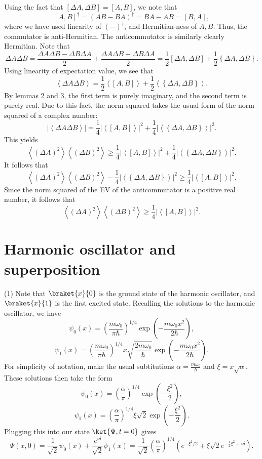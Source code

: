 \documentclass[11pt, letterpaper]{article}
\begin{document}
Using the fact that $[\Delta A,\Delta B]=[A,B]$, we note that
\[
	\left[ A,B \right] ^\dagger = \left( AB-BA \right) ^\dagger=BA-AB=[B,A],
\]
where we have used linearity of $(-)^\dagger$, and Hermitian-ness of $A,B$. Thus, the commutator is anti-Hermitian. The anticommutator is similarly clearly Hermitian. Note that
\[
	\Delta A\Delta B=\frac{\Delta A\Delta B-\Delta B\Delta A}{2} +\frac{\Delta A\Delta B+\Delta B\Delta A}{2} =\frac{1}{2} [\Delta A,\Delta B]+\frac{1}{2} \left\{ \Delta A,\Delta B \right\} 
.\]
Using linearity of expectation value, we see that
\[
	\left\langle \Delta A\Delta B \right\rangle =\frac{1}{2} \left\langle [A,B] \right\rangle +\frac{1}{2} \left\langle \left\{ \Delta A,\Delta B \right\}  \right\rangle 
.\]
By lemmas 2 and 3, the first term is purely imaginary, and the second term is purely real. Due to this fact, the norm squared takes the usual form of the norm squared of a complex number:
\[
	\left| \left\langle \Delta A\Delta B \right\rangle  \right| =\frac{1}{4} \left| \left\langle \left[ A,B \right]  \right\rangle  \right| ^2+\frac{1}{4} \left| \left\langle \left\{ \Delta A,\Delta B \right\}  \right\rangle  \right| ^2
.\]
This yields
\[
	\left\langle (\Delta A)^2 \right\rangle \left\langle (\Delta B)^2 \right\rangle\geq \frac{1}{4} \left| \left\langle \left[ A,B \right]  \right\rangle  \right| ^2+\frac{1}{4} \left| \left\langle \left\{ \Delta A,\Delta B \right\}  \right\rangle  \right| ^2
.\]
It follows that
\[
	\left\langle (\Delta A)^2 \right\rangle \left\langle (\Delta B)^2 \right\rangle-\frac{1}{4} \left| \left\langle \left\{ \Delta A,\Delta B \right\}  \right\rangle  \right| ^2\geq \frac{1}{4} \left| \left\langle \left[ A,B \right]  \right\rangle  \right| ^2
.\]
Since the norm squared of the EV of the anticommutator is a positive real number, it follows that
\[
	\left\langle (\Delta A)^2 \right\rangle \left\langle (\Delta B)^2 \right\rangle\geq \frac{1}{4} \left| \left\langle \left[ A,B \right]  \right\rangle  \right| ^2
.\]
\section{Harmonic oscillator and superposition}
(1) Note that $\braket{x}{0}$ is the ground state of the harmonic oscillator, and $\braket{x}{1}$ is the first excited state. Recalling the solutions to the harmonic oscillator, we have
\[
	\psi _0(x)=\left( \frac{m\omega _0}{\pi \hbar}  \right) ^{1/4} \exp \left( -\frac{m\omega _0x^2}{2\hbar}  \right) 
,\]
\[
	\psi _1(x)=\left( \frac{m\omega _0}{\pi \hbar}  \right) ^{1/4} x\sqrt{\frac{2m\omega _0}{\hbar} } \exp \left( -\frac{m\omega _0x^2}{2\hbar}  \right) 
.\]
For simplicity of notation, make the usual subtitutions $\alpha=\frac{m\omega _0}{\hbar} $ and $\xi =x\sqrt{\alpha } $. These solutions then take the form
\[
	\psi _0(x)=\left( \frac{\alpha }{\pi }  \right) ^{1/4} \exp \left( -\frac{\xi ^2}{2}   \right) ,
\]
\[
	\psi _1(x)=\left( \frac{\alpha }{\pi }  \right) ^{1/4} \xi \sqrt{2}\exp \left( -\frac{\xi ^2}{2}  \right) 
.\]
Plugging this into our state $\ket{\Psi ,t=0}$ gives
\[
	\Psi (x,0)=\frac{1}{\sqrt{2} } \psi _0(x)+\frac{e^{i\delta } }{\sqrt{2} } \psi _1(x)=\frac{1}{\sqrt{2} } \left( \frac{\alpha }{\pi }  \right) ^{1/4} \left( e^{-\xi ^2/2} +\xi \sqrt{2} e^{-\frac{1}{2}\xi ^2 +i\delta }  \right) 
.\]
\end{document}
